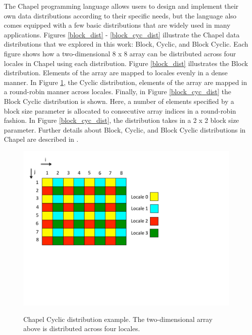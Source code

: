 The Chapel programming language allows users to design and implement their own data distributions according to their specific needs, but the language also comes equipped with a few basic distributions that are widely used in many applications. Figures \ref{block_dist} - \ref{block_cyc_dist} illustrate the Chapel data distributions that we explored in this work: Block, Cyclic, and Block Cyclic. Each figure shows how a two-dimensional 8 x 8 array can be distributed across four locales in Chapel using each distribution. Figure \ref{block_dist} illustrates the Block distribution. Elements of the array are mapped to locales evenly in a dense manner. In Figure \ref{cyc_dist}, the Cyclic distribution, elements of the array are mapped in a round-robin manner across locales. Finally, in Figure \ref{block_cyc_dist} the Block Cyclic distribution is shown. Here, a number of elements specified by a block size parameter is allocated to consecutive array indices in a round-robin fashion. In Figure \ref{block_cyc_dist}, the distribution takes in a 2 x 2 block size parameter. Further details about Block, Cyclic, and Block Cyclic distributions in Chapel are described in \cite{distributions}.

\begin{figure}
\begin{center}
\includegraphics[width=\linewidth]{./Figures/cyc_dist}
\renewcommand{\baselinestretch}{1}
\small\normalsize
\begin{quote}
\caption[Chapel Cyclic distribution]{Chapel Cyclic distribution example. The two-dimensional array above is distributed across four locales. \label{cyc_dist}}
\end{quote}
\end{center}
\end{figure}

